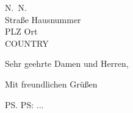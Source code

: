 \begin{letter}{
    N.~N.\\
    Straße Hausnummer\\
    PLZ Ort\\
    COUNTRY
}



    \opening{Sehr geehrte Damen und Herren,}

    \lipsum[1-5]

    \closing{Mit freundlichen Grüßen}

    \ps PS: ...

    \encl{}
    \cc{}

\end{letter}